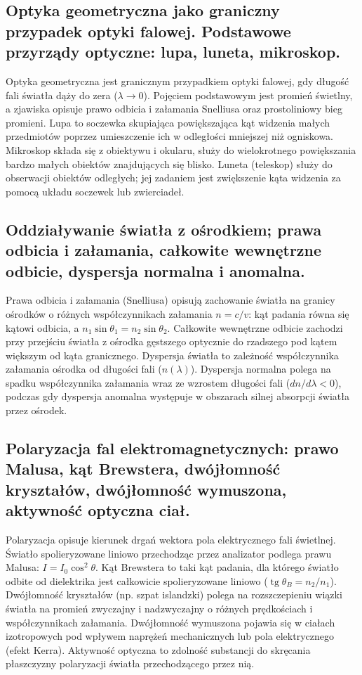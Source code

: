 \documentclass[11pt,a4paper]{article}
\begin{document}
\subsection{Optyka geometryczna jako graniczny przypadek optyki falowej. Podstawowe przyrządy optyczne: lupa, luneta, mikroskop.}
Optyka geometryczna jest granicznym przypadkiem optyki falowej, gdy długość fali światła dąży do zera ($\lambda \to 0$). Pojęciem podstawowym jest promień świetlny, a zjawiska opisuje prawo odbicia i załamania Snelliusa oraz prostoliniowy bieg promieni. Lupa to soczewka skupiająca powiększająca kąt widzenia małych przedmiotów poprzez umieszczenie ich w odległości mniejszej niż ogniskowa. Mikroskop składa się z obiektywu i okularu, służy do wielokrotnego powiększania bardzo małych obiektów znajdujących się blisko. Luneta (teleskop) służy do obserwacji obiektów odległych; jej zadaniem jest zwiększenie kąta widzenia za pomocą układu soczewek lub zwierciadeł.

\subsection{Oddziaływanie światła z ośrodkiem; prawa odbicia i załamania, całkowite wewnętrzne odbicie, dyspersja normalna i anomalna.}
Prawa odbicia i załamania (Snelliusa) opisują zachowanie światła na granicy ośrodków o różnych współczynnikach załamania $n = c/v$: kąt padania równa się kątowi odbicia, a $n_1 \sin\theta_1 = n_2 \sin\theta_2$. Całkowite wewnętrzne odbicie zachodzi przy przejściu światła z ośrodka gęstszego optycznie do rzadszego pod kątem większym od kąta granicznego. Dyspersja światła to zależność współczynnika załamania ośrodka od długości fali ($n(\lambda)$). Dyspersja normalna polega na spadku współczynnika załamania wraz ze wzrostem długości fali ($dn/d\lambda < 0$), podczas gdy dyspersja anomalna występuje w obszarach silnej absorpcji światła przez ośrodek.

\subsection{Polaryzacja fal elektromagnetycznych: prawo Malusa, kąt Brewstera, dwójłomność kryształów, dwójłomność wymuszona, aktywność optyczna ciał.}
Polaryzacja opisuje kierunek drgań wektora pola elektrycznego fali świetlnej. Światło spolieryzowane liniowo przechodząc przez analizator podlega prawu Malusa: $I = I_0 \cos^2\theta$. Kąt Brewstera to taki kąt padania, dla którego światło odbite od dielektrika jest całkowicie spolieryzowane liniowo ($\operatorname{tg}\theta_B = n_2/n_1$). Dwójłomność kryształów (np. szpat islandzki) polega na rozszczepieniu wiązki światła na promień zwyczajny i nadzwyczajny o różnych prędkościach i współczynnikach załamania. Dwójłomność wymuszona pojawia się w ciałach izotropowych pod wpływem naprężeń mechanicznych lub pola elektrycznego (efekt Kerra). Aktywność optyczna to zdolność substancji do skręcania płaszczyzny polaryzacji światła przechodzącego przez nią.
\end{document}
